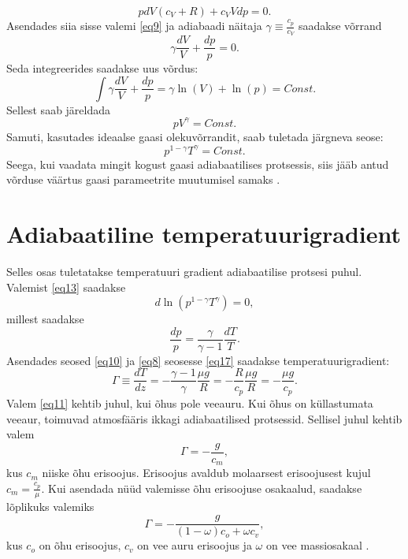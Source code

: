 \documentclass{trkut}%
\begin{document}
\begin{equation}\label{eq4}
pdV(c_V+R)+c_VVdp=0.
\end{equation}
Asendades siia sisse valemi \ref{eq9} ja adiabaadi näitaja $ \gamma \equiv \frac{c_p}{c_V}$ saadakse võrrand
\begin{equation*}
\gamma \frac{dV}{V} + \frac{dp}{p} = 0.
\end{equation*}
Seda integreerides saadakse uus võrdus:
\begin{equation*}
 \int \gamma \frac{dV}{V} + \frac{dp}{p} = \gamma \ln(V) + \ln(p) = Const.
\end{equation*}
Sellest saab järeldada
\begin{equation*}
pV^\gamma = Const.
\end{equation*}
Samuti, kasutades ideaalse gaasi olekuvõrrandit, saab tuletada järgneva seose:
\begin{equation}\label{eq13}
p^{1-\gamma}T^\gamma = Const.
\end{equation}
Seega, kui vaadata mingit kogust gaasi adiabaatilises protsessis, siis jääb antud võrduse väärtus gaasi parameetrite muutumisel samaks \parencite{JKtermo}.

\section{Adiabaatiline temperatuurigradient }
Selles osas tuletatakse temperatuuri gradient adiabaatilise protsesi puhul. Valemist \ref{eq13} saadakse
\begin{equation*}
d\ln(p^{1-\gamma}T^\gamma) = 0,
\end{equation*}
millest saadakse
\begin{equation}\label{eq17}
\frac{dp}{p} = \frac{\gamma}{\gamma-1}\frac{dT}{T}.
\end{equation}
Asendades seosed \ref{eq10} ja \ref{eq8} seosesse \ref{eq17} saadakse temperatuurigradient:
\begin{equation}\label{eq11}
\Gamma \equiv \frac{dT}{dz}=-\frac{\gamma-1}{\gamma} \frac{\mu g}{R} = -\frac{R}{c_p}\frac{\mu g}{R} = -\frac{\mu g}{c_p}.
\end{equation}
Valem \ref{eq11} kehtib juhul, kui õhus pole veeauru. Kui õhus on küllastumata veeaur, toimuvad atmosfääris ikkagi adiabaatilised protsessid. Sellisel juhul kehtib valem 
\begin{equation*}
\Gamma = -\frac{g}{c_m} ,
\end{equation*}
kus $c_m$ niiske õhu erisoojus. Erisoojus avaldub molaarsest erisoojusest kujul $c_m=\frac{c_p}{\mu}$. Kui asendada nüüd valemisse õhu erisoojuse osakaalud, saadakse lõplikuks valemiks
\begin{equation}\label{eq12}
\Gamma = -\frac{g}{(1-\omega)c_{o} + \omega c_{v}} ,
\end{equation}
kus $c_{o}$ on õhu erisoojus, $c_{v}$ on vee auru erisoojus ja $\omega$ on vee massiosakaal \parencite[36]{raamat2}.
\end{document}
